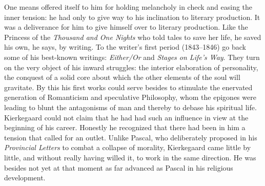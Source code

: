 \documentclass[12pt,a4paper]{article}
\begin{document}
One means offered itself to him for holding melancholy in check and easing the
inner tension: he had only to give way to his inclination to literary
production. It was a deliverance for him to give himself over to literary
production.
Like the Princess of the \emph{Thousand and One Nights} who told tales to save
her life, he saved his own, he says, by writing. To the writer's first period
(1843--1846) go back some of his best-known writings: \emph{Either/Or} and
\emph{Stages on Life's Way}. They turn on the very object of his inward
struggles: the interior elaboration of personality, the conquest of a solid
core about which the other elements of the soul will gravitate. By this his
first works could serve besides to stimulate the enervated generation of
Romanticism and speculative Philosophy, whom the epigones were leading to blunt
the antagonisms of man and thereby to debase his spiritual life. Kierkegaard
could not claim that he had had such an influence in view at the beginning of
his career. Honestly he recognized that there had been in him a tension that
called for an outlet. Unlike Pascal, who deliberately proposed in his
\emph{Provincial Letters} to combat a collapse of morality, Kierkegaard came
little by little, and without really having willed it, to work in the same
direction. He was besides not yet at that moment as far advanced as Pascal in
his religious development.
\end{document}
